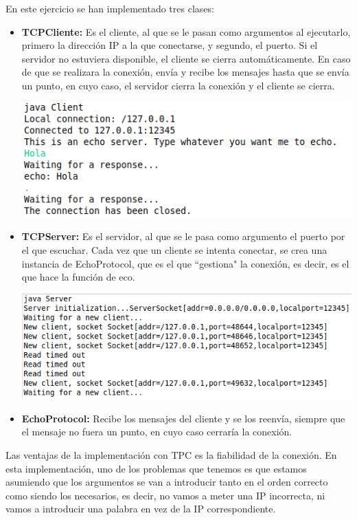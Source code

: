 \documentclass{article}
\begin{document}
En este ejercicio se han implementado tres clases:

\begin{itemize}
\item \textbf{TCPCliente:} Es el cliente, al que se le pasan como argumentos al ejecutarlo, primero la dirección IP a la que conectarse, y segundo, el puerto. Si el servidor no estuviera disponible, el cliente se cierra automáticamente. En caso de que se realizara la conexión, envía y recibe los mensajes hasta que se envía un punto, en cuyo caso, el servidor cierra la conexión y el cliente se cierra.
\begin{center}
\includegraphics[scale=0.4]{images/TCPClient.png}
\end{center}
\item \textbf{TCPServer:} Es el servidor, al que se le pasa como argumento el puerto por el que escuchar. Cada vez que un cliente se intenta conectar, se crea una instancia de EchoProtocol, que es el que ``gestiona" la conexión, es decir, es el que hace la función de eco.
\begin{center}
\includegraphics[scale=0.4]{images/TCPServer.png}
\end{center}
\item \textbf{EchoProtocol:} Recibe los mensajes del cliente y se los reenvía, siempre que el mensaje no fuera un punto, en cuyo caso cerraría la conexión.
\end{itemize}

Las ventajas de la implementación con TPC es la fiabilidad de la conexión. En esta implementación, uno de los problemas que tenemos es que estamos asumiendo que los argumentos se van a introducir tanto en el orden correcto como siendo los necesarios, es decir, no vamos a meter una IP incorrecta, ni vamos a introducir una palabra en vez de la IP correspondiente.
\end{document}
